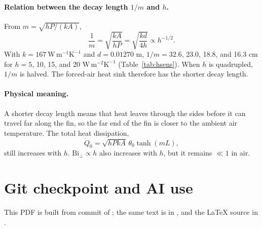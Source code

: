 \documentclass[reprint, amsmath, amssymb, aps, prl]{revtex4-2}
\newcommand{\Qdot}{\dot Q}
\newcommand{\Biperp}{\mathrm{Bi}_\perp}
\newcommand{\WmK}{\mathrm{W\,m^{-1}K^{-1}}}
\newcommand{\WmmK}{\mathrm{W\,m^{-2}K^{-1}}}
\begin{document}
\paragraph*{Relation between the decay length $1/m$ and $h$.}
From $m=\sqrt{hP/(kA)}$,
\begin{equation*}
\frac{1}{m}=\sqrt{\frac{kA}{hP}}=\sqrt{\frac{kd}{4h}}\propto h^{-1/2}.
\end{equation*}
With $k=167~\WmK$ and $d=0.01270$ m, $1/m=32.6$, 23.0, 18.8, and 16.3 cm for $h=5$, 10,
15, and 20 $\WmmK$ (Table~\ref{tab:hsens}). When $h$ is quadrupled, $1/m$ is halved. The
forced-air heat sink therefore has the shorter decay length.

\paragraph*{Physical meaning.}
A shorter decay length means that heat leaves through the sides before it can travel far
along the fin, so the far end of the fin is closer to the ambient air temperature. The
total heat dissipation,
\begin{equation*}
\Qdot_0=\sqrt{hPkA}\,\theta_0\tanh(mL),
\end{equation*}
still increases with $h$. $\Biperp\propto h$ also increases with $h$, but it remains
$\ll1$ in air.

\section*{Git checkpoint and AI use}

This PDF is built from commit \texttt{\commit} of \repourl; the same text is in
, and the LaTeX source in
.
\end{document}

